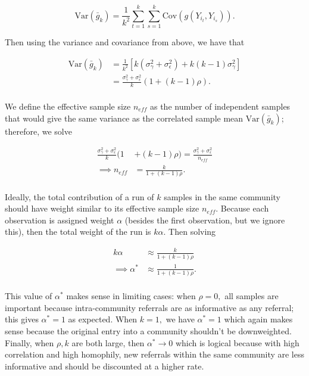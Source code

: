 \documentclass[11pt,a4paper,twocolumn,twoside]{rho-class/rho}
\begin{document}
\[
\text{Var}(\bar g_k) = \frac{1}{k^2} \sum_{t = 1}^k \sum_{s = 1}^k \text{Cov}(g(Y_{i_t}, Y_{i_s})).
\]

\noindent Then using the variance and covariance from above, we have that

\begin{align*}
\text{Var}(\bar g_k) &= \frac{1}{k^2}[k(\sigma^2_\gamma + \sigma^2_\epsilon) + k(k - 1)\sigma^2_\gamma] \\
&= \frac{\sigma^2_\gamma + \sigma^2_\epsilon}{k} (1 + (k - 1)\rho). \\
\end{align*}

We define the effective sample size $n_{eff}$ as the number of independent samples that would give the same variance as the correlated sample mean $\text{Var}(\bar g_k)$; therefore, we solve

\begin{align*}
    \frac{\sigma^2_\gamma + \sigma^2_\epsilon}{k} (1 &+ (k - 1)\rho) = \frac{\sigma^2_\gamma + \sigma^2_\epsilon}{n_{eff}} \\
    \implies n_{eff} &= \frac{k}{1 + (k - 1)\rho}.\\
\end{align*}

\noindent Ideally, the total contribution of a run of $k$ samples in the same community should have weight similar to its effective sample size $n_{eff}.$ Because each observation is assigned weight $\alpha$ (besides the first observation, but we ignore this), then the total weight of the run is $k \alpha.$ Then solving

\begin{align*}
    k\alpha &\approx \frac{k}{1 + (k - 1)\rho} \\
    \implies \alpha^* &\approx \frac{1}{1 + (k - 1)\rho}.\\
\end{align*}

This value of $\alpha^*$ makes sense in limiting cases: when $\rho = 0,$ all samples are important because intra-community referrals are as informative as any referral; this gives $\alpha^* = 1$ as expected. When $k = 1,$ we have $\alpha^* = 1$ which again makes sense because the original entry into a community shouldn't be downweighted. Finally, when $\rho, k$ are both large, then $\alpha^* \to 0$ which is logical because with high correlation and high homophily, new referrals within the same community are less informative and should be discounted at a higher rate.
\end{document}
